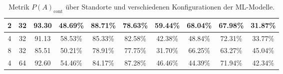 \begin{table}[h!]
\begin{tabular}{ | c | c | c | c | c | c | c | c | c | c | }
        2 & 32 & 93.30 & 48.69\% & 88.71\% & 78.63\% & 59.44\% & 68.04\% & 67.98\% & 31.87\% \\\hline
        4 & 32 & 91.13 & 58.53\% & 85.33\% & 82.58\% & 42.38\% & 48.84\% & 72.31\% & 33.77\% \\\hline
        8 & 32 & 85.51 & 50.21\% & 78.91\% & 77.75\% & 31.70\% & 66.25\% & 63.27\% & 45.04\% \\\hline
        4 & 64 & 92.60 & 54.46\% & 84.17\% & 87.28\% & 46.46\% & 44.39\% & 71.94\% & 42.34\% \\\hline
    \end{tabular}
    \caption{Metrik $P(A)_{\text{cont}}$ über Standorte und verschiedenen Konfigurationen der ML-Modelle.}
    \label{tab:predictions_by_acc_cont}
\end{table}
